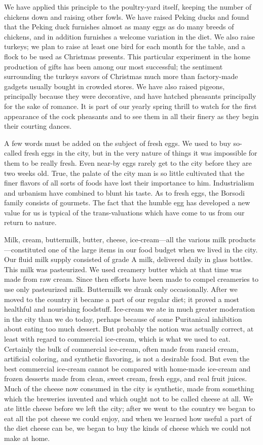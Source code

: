 \documentclass{book}
\begin{document}
We have applied this principle to the poultry-yard itself, keeping the number of chickens down and raising other fowls. We have raised Peking ducks and found that the Peking duck furnishes almost as many eggs as do many breeds of chickens, and in addition furnishes a welcome variation in the diet. We also raise turkeys; we plan to raise at least one bird for each month for the table, and a flock to be used as Christmas presents. This particular experiment in the home production of gifts has been among our most successful; the sentiment surrounding the turkeys savors of Christmas much more than factory-made gadgets usually bought in crowded stores. We have also raised pigeons, principally because they were decorative, and have hatched pheasants principally for the sake of romance. It is part of our yearly spring thrill to watch for the first appearance of the cock pheasants and to see them in all their finery as they begin their courting dances.

A few words must be added on the subject of fresh eggs. We used to buy so-called fresh eggs in the city, but in the very nature of things it was impossible for them to be really fresh. Even near-by eggs rarely get to the city before they are two weeks old. True, the palate of the city man is so little cultivated that the finer flavors of all sorts of foods have lost their importance to him. Industrialism and urbanism have combined to blunt his taste. As to fresh eggs, the Borsodi family consists of gourmets. The fact that the humble egg has developed a new value for us is typical of the trans-valuations which have come to us from our return to nature.

Milk, cream, buttermilk, butter, cheese, ice-cream—all the various milk products—constituted one of the large items in our food budget when we lived in the city. Our fluid milk supply consisted of grade A milk, delivered daily in glass bottles. This milk was pasteurized. We used creamery butter which at that time was made from raw cream. Since then efforts have been made to compel creameries to use only pasteurized milk. Buttermilk we drank only occasionally. After we moved to the country it became a part of our regular diet; it proved a most healthful and nourishing foodstuff. Ice-cream we ate in much greater moderation in the city than we do today, perhaps because of some Puritanical inhibition about eating too much dessert. But probably the notion was actually correct, at least with regard to commercial ice-cream, which is what we used to eat. Certainly the bulk of commercial ice-cream, often made from rancid cream, artificial coloring, and synthetic flavoring, is not a desirable food. But even the best commercial ice-cream cannot be compared with home-made ice-cream and frozen desserts made from clean, sweet cream, fresh eggs, and real fruit juices. Much of the cheese now consumed in the city is synthetic, made from something which the breweries invented and which ought not to be called cheese at all. We ate little cheese before we left the city; after we went to the country we began to eat all the pot cheese we could enjoy, and when we learned how useful a part of the diet cheese can be, we began to buy the kinds of cheese which we could not make at home.
\end{document}

